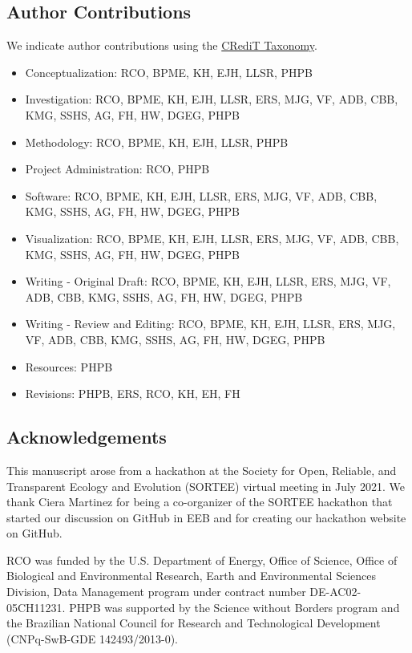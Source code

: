 \hypertarget{author-contributions}{%
\subsection{Author Contributions}\label{author-contributions}}

We indicate author contributions using the \href{https://casrai.org/credit/}{CRediT Taxonomy}.

\begin{itemize}
\tightlist
\item
  Conceptualization: RCO, BPME, KH, EJH, LLSR, PHPB
\item
  Investigation: RCO, BPME, KH, EJH, LLSR, ERS, MJG, VF, ADB, CBB, KMG, SSHS, AG, FH, HW, DGEG, PHPB
\item
  Methodology: RCO, BPME, KH, EJH, LLSR, PHPB
\item
  Project Administration: RCO, PHPB
\item
  Software: RCO, BPME, KH, EJH, LLSR, ERS, MJG, VF, ADB, CBB, KMG, SSHS, AG, FH, HW, DGEG, PHPB
\item
  Visualization: RCO, BPME, KH, EJH, LLSR, ERS, MJG, VF, ADB, CBB, KMG, SSHS, AG, FH, HW, DGEG, PHPB
\item
  Writing - Original Draft: RCO, BPME, KH, EJH, LLSR, ERS, MJG, VF, ADB, CBB, KMG, SSHS, AG, FH, HW, DGEG, PHPB
\item
  Writing - Review and Editing: RCO, BPME, KH, EJH, LLSR, ERS, MJG, VF, ADB, CBB, KMG, SSHS, AG, FH, HW, DGEG, PHPB
\item
  Resources: PHPB
\item
  Revisions: PHPB, ERS, RCO, KH, EH, FH
\end{itemize}

\hypertarget{acknowledgements}{%
\subsection{Acknowledgements}\label{acknowledgements}}

This manuscript arose from a hackathon at the Society for Open, Reliable, and Transparent Ecology and Evolution (SORTEE) virtual meeting in July 2021.
We thank Ciera Martinez for being a co-organizer of the SORTEE hackathon that started our discussion on GitHub in EEB and for creating our hackathon website on GitHub.

RCO was funded by the U.S. Department of Energy, Office of Science, Office of Biological and Environmental Research, Earth and Environmental Sciences Division, Data Management program under contract number DE-AC02-05CH11231.
PHPB was supported by the Science without Borders program and the Brazilian National Council for Research and Technological Development (CNPq-SwB-GDE 142493/2013-0).


